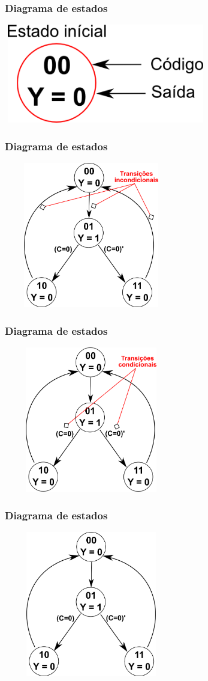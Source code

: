 \documentclass{beamer}
\begin{document}
\begin{frame}
  \frametitle{Diagrama de estados}
    \includegraphics[height = 1.7in, width = 3.5in]{mealyvsmoore.png}
\end{frame}

\begin{frame}
  \frametitle{Diagrama de estados}
    \includegraphics[height = 2.5in, width = 3in]{mealyvsmoore_2.png}
\end{frame}

\begin{frame}
  \frametitle{Diagrama de estados}
    \includegraphics[height = 2.5in, width = 3in]{mealyvsmoore_3.png}
\end{frame}

\begin{frame}
  \frametitle{Diagrama de estados}
    \includegraphics[height = 2.5in, width = 3in]{mealyvsmoore_4.png}
\end{frame}
\end{document}

